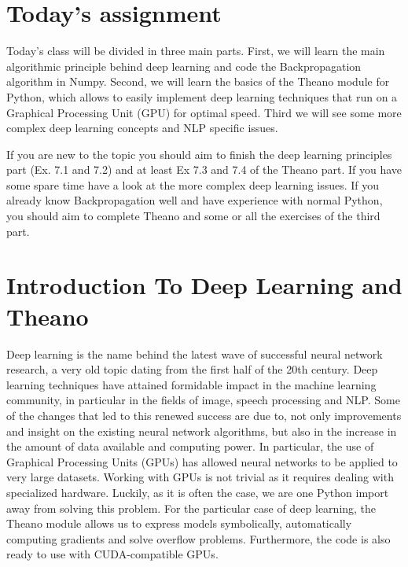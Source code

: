 \section{Today's assignment}
Today's class will be divided in three main parts. First, we will learn the main 
algorithmic principle behind deep learning and code the Backpropagation algorithm 
in Numpy.  Second, we will learn the basics of the Theano module for Python, 
which allows to easily implement deep learning techniques that run on a 
Graphical Processing Unit (GPU) for optimal speed. Third we will see some more 
complex deep learning concepts and NLP specific issues.

If you are new to the topic you should aim to finish the deep learning 
principles part (Ex. 7.1 and 7.2) and at least Ex 7.3 and 7.4 of the Theano 
part. If you have some spare time have a look at the more complex deep learning 
issues. If you already know Backpropagation well and have experience with normal 
Python, you should aim to complete Theano and some or all the exercises of the 
third part. 

\section{Introduction To Deep Learning and Theano}

Deep learning is the name behind the latest wave of successful neural network 
research, a very old topic dating from the first half of the 20th century. Deep 
learning techniques have attained formidable impact in the machine learning 
community, in particular in the fields of image, speech processing and NLP. 
Some of the changes that led to this renewed success are due to, not only
improvements and insight on the existing neural network algorithms, but also in
the increase in the amount of data available and computing power. In
particular, the use of Graphical Processing Units (GPUs) has allowed neural
networks to be applied to very large datasets. Working with GPUs is not trivial
as it requires dealing with specialized hardware. Luckily, as it is often the
case, we are one Python import away from solving this problem. For the
particular case of deep learning, the
Theano\footnotemark{}
module allows us to express models symbolically, automatically computing
gradients and solve overflow problems. Furthermore, the code is also ready to
use with CUDA-compatible GPUs.

